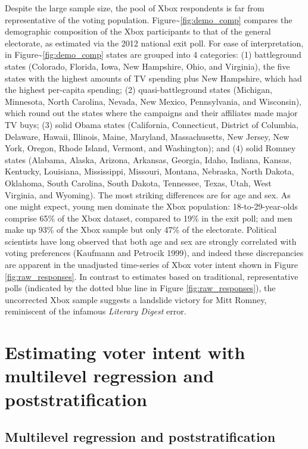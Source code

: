 Despite the large sample size, the pool of Xbox respondents is far from
representative of the voting population.
Figure\textasciitilde{}\ref{fig:demo_comp} compares the demographic
composition of the Xbox participants to that of the general electorate,
as estimated via the 2012 national exit poll. For ease of
interpretation, in Figure\textasciitilde{}\ref{fig:demo_comp} states are
grouped into 4 categories: (1) battleground states (Colorado, Florida,
Iowa, New Hampshire, Ohio, and Virginia), the five states with the
highest amounts of TV spending plus New Hampshire, which had the highest
per-capita spending; (2) quasi-battleground states (Michigan, Minnesota,
North Carolina, Nevada, New Mexico, Pennsylvania, and Wisconsin), which
round out the states where the campaigns and their affiliates made major
TV buys; (3) solid Obama states (California, Connecticut, District of
Columbia, Delaware, Hawaii, Illinois, Maine, Maryland, Massachusetts,
New Jersey, New York, Oregon, Rhode Island, Vermont, and Washington);
and (4) solid Romney states (Alabama, Alaska, Arizona, Arkansas,
Georgia, Idaho, Indiana, Kansas, Kentucky, Louisiana, Mississippi,
Missouri, Montana, Nebraska, North Dakota, Oklahoma, South Carolina,
South Dakota, Tennessee, Texas, Utah, West Virginia, and Wyoming). The
most striking differences are for age and sex. As one might expect,
young men dominate the Xbox population: 18-to-29-year-olds comprise 65\%
of the Xbox dataset, compared to 19\% in the exit poll; and men make up
93\% of the Xbox sample but only 47\% of the electorate. Political
scientists have long observed that both age and sex are strongly
correlated with voting preferences (Kaufmann and Petrocik 1999), and
indeed these discrepancies are apparent in the unadjusted time-series of
Xbox voter intent shown in Figure \ref{fig:raw_responses}. In contrast
to estimates based on traditional, representative polls (indicated by
the dotted blue line in Figure \ref{fig:raw_responses}), the uncorrected
Xbox sample suggests a landslide victory for Mitt Romney, reminiscent of
the infamous \emph{Literary Digest} error.

\section{Estimating voter intent with multilevel regression and
poststratification}\label{estimating-voter-intent-with-multilevel-regression-and-poststratification}

\subsection{Multilevel regression and
poststratification}\label{multilevel-regression-and-poststratification}

